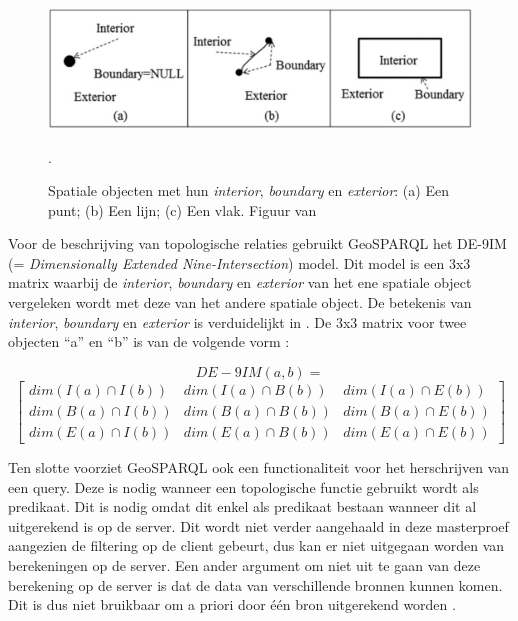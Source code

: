 \documentclass[twocolumn]{phdsymp} %
\begin{document}
\begin{figure}[ht]
    \centering
    \includegraphics[width=\linewidth]{images/spatial_objects_DE-9IM.png}
    \caption{Spatiale objecten met hun \textit{interior}, \textit{boundary} en \textit{exterior}: (a) Een punt; (b) Een lijn; (c) Een vlak. Figuur van \protect\cite{shen2018classification}}.
    \label{fig:abstr_de-9im}
\end{figure}

Voor de beschrijving van topologische relaties gebruikt GeoSPARQL het DE-9IM (= \textit{Dimensionally Extended Nine-Intersection}) model. Dit model is een 3x3 matrix waarbij de \textit{interior}, \textit{boundary} en \textit{exterior} van het ene spatiale object vergeleken wordt met deze van het andere spatiale object. De betekenis van \textit{interior}, \textit{boundary} en \textit{exterior} is verduidelijkt in . De 3x3 matrix voor twee objecten ``a'' en ``b'' is van de volgende vorm \cite{shen2018classification}:

\begin{equation*}
    DE-9IM(a,b) = 
\end{equation*}
\begin{equation*}
    \begin{bmatrix}
        dim(I(a)\cap I(b)) & dim(I(a)\cap B(b)) & dim(I(a)\cap E(b))\\
        dim(B(a)\cap I(b)) & dim(B(a)\cap B(b)) & dim(B(a)\cap E(b))\\
        dim(E(a)\cap I(b)) & dim(E(a)\cap B(b)) & dim(E(a)\cap E(b))
    \end{bmatrix}
\end{equation*}

Ten slotte voorziet GeoSPARQL ook een functionaliteit voor het herschrijven van een query. Deze is nodig wanneer een topologische functie gebruikt wordt als predikaat. Dit is nodig omdat dit enkel als predikaat bestaan wanneer dit al uitgerekend is op de server. Dit wordt niet verder aangehaald in deze masterproef aangezien de filtering op de client gebeurt, dus kan er niet uitgegaan worden van berekeningen op de server. Een ander argument om niet uit te gaan van deze berekening op de server is dat de data van verschillende bronnen kunnen komen. Dit is dus niet bruikbaar om a priori door één bron uitgerekend worden \cite{ogcdocs}.
\end{document}
